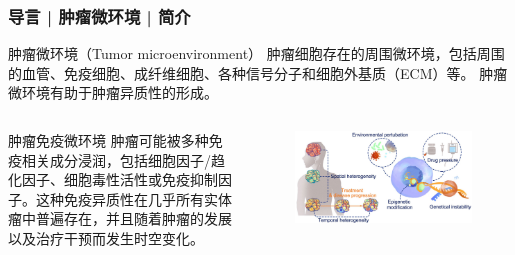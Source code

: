 \documentclass[11pt]{ctexbeamer}
\begin{document}
\begin{frame}
  \frametitle{导言 | 肿瘤微环境 | 简介}
  \begin{block}{肿瘤微环境（Tumor microenvironment）}
    肿瘤细胞存在的周围微环境，包括周围的血管、免疫细胞、成纤维细胞、各种信号分子和细胞外基质（ECM）等。 肿瘤微环境有助于肿瘤异质性的形成。
  \end{block}
  \vspace{-0.3em}
  \pause
  \begin{columns}
  \begin{block}{肿瘤免疫微环境}
    肿瘤可能被多种免疫相关成分浸润，包括细胞因子/趋化因子、细胞毒性活性或免疫抑制因子。这种免疫异质性在几乎所有实体瘤中普遍存在，并且随着肿瘤的发展以及治疗干预而发生时空变化。
  \end{block}
  \begin{figure}
    \centering
    \includegraphics[width=\textwidth]{tumor_imm_het.png}
  \end{figure}
  \end{columns}
\end{frame}
\end{document}

